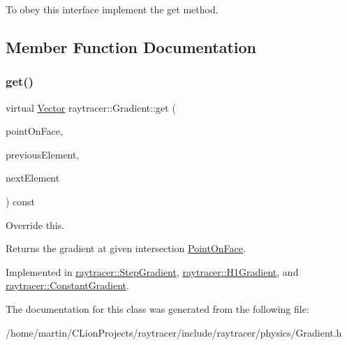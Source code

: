 To obey this interface implement the get method. 

\subsection{Member Function Documentation}
\mbox{\label{classraytracer_1_1Gradient_a93ccfef0662634c5f9a3c8dd04e73496}} 
\subsubsection{\texorpdfstring{get()}{get()}}
{\footnotesize\ttfamily virtual \hyperlink{classraytracer_1_1Vector}{Vector} raytracer\+::\+Gradient\+::get (\begin{DoxyParamCaption}\item[{const \hyperlink{structraytracer_1_1PointOnFace}{Point\+On\+Face} \&}]{point\+On\+Face,  }\item[{const \hyperlink{classraytracer_1_1Element}{Element} \&}]{previous\+Element,  }\item[{const \hyperlink{classraytracer_1_1Element}{Element} \&}]{next\+Element }\end{DoxyParamCaption}) const\hspace{0.3cm}{\ttfamily [pure virtual]}}



Override this. 

\begin{DoxyReturn}{Returns}
the gradient at given intersection \hyperlink{structraytracer_1_1PointOnFace}{Point\+On\+Face}. 
\end{DoxyReturn}


Implemented in \hyperlink{classraytracer_1_1StepGradient_a0c18f1abff911e8ebd91184b55c8c0ef}{raytracer\+::\+Step\+Gradient}, \hyperlink{classraytracer_1_1H1Gradient_a7c847fef0d9cb6fbd143552acace82a5}{raytracer\+::\+H1\+Gradient}, and \hyperlink{classraytracer_1_1ConstantGradient_afd5e248b930551c0ad1bf84482b930b9}{raytracer\+::\+Constant\+Gradient}.



The documentation for this class was generated from the following file\+:\begin{DoxyCompactItemize}
\item 
/home/martin/\+C\+Lion\+Projects/raytracer/include/raytracer/physics/Gradient.\+h\end{DoxyCompactItemize}
